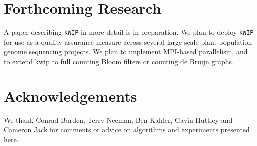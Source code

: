 \documentclass[a0,portrait]{a0poster}
\begin{document}
\begin{multicols}{2}


\section*{Forthcoming Research}

A paper describing \texttt{kWIP} in more detail is in preparation. We plan to
deploy \texttt{kWIP} for use as a quality assurance measure across several
large-scale plant population genome sequencing projects. We plan to implement
MPI-based parallelism, and to extend kwip to full counting Bloom filters or
counting de Bruijn graphs.


\section*{Acknowledgements}

We thank Conrad Burden, Terry Neeman, Ben Kahler, Gavin Huttley and Cameron
Jack for comments or advice on algorithms and experiments presented here.

\end{multicols}
\begin{multicols}{2}


\tiny
\printbibliography
\normalsize

\end{multicols}
\end{document}
